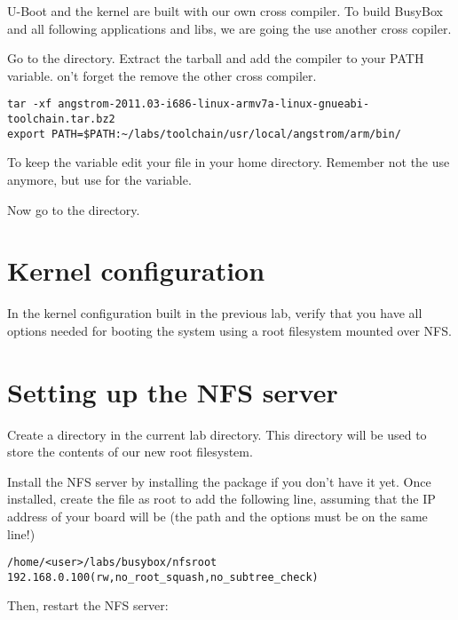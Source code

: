U-Boot and the kernel are built with our own cross compiler.
To build BusyBox and all following applications and libs, we are going the use another cross copiler.

Go to the  directory.
Extract the tarball and add the compiler to your PATH variable.
on't forget the remove the other cross compiler.

\begin{verbatim}
tar -xf angstrom-2011.03-i686-linux-armv7a-linux-gnueabi-toolchain.tar.bz2
export PATH=$PATH:~/labs/toolchain/usr/local/angstrom/arm/bin/
\end{verbatim}

To keep the  variable edit your  file in your home directory.
Remember not the use  anymore, but use  for the  variable.

Now go to the  directory.

\section{Kernel configuration}

In the kernel configuration built in the previous lab, verify that you
have all options needed for booting the system using a root filesystem
mounted over NFS.

\section{Setting up the NFS server}

Create a  directory in the current lab directory. This
 directory will be used to store the contents of our new
root filesystem.

Install the NFS server by installing the 
package if you don't have it yet. Once installed, create the
 file as root to add the following line, assuming that the
IP address of your board will be  (the path and the
options must be on the same line!)

\footnotesize
\begin{verbatim}
/home/<user>/labs/busybox/nfsroot 192.168.0.100(rw,no_root_squash,no_subtree_check)
\end{verbatim}
\normalsize

Then, restart the NFS server:

